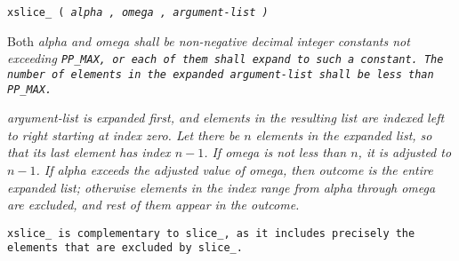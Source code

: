 
\tt{xslice_ (} \it{alpha} \tt{,} \it{omega} \tt{,} \it{argument-list} \tt{)}


Both \it{alpha} and \it{omega} shall be non-negative decimal integer constants
not exceeding \tt{PP_MAX}, or each of them shall expand to such a constant.
The number of elements in the expanded
\it{argument-list} shall be less than \tt{PP_MAX}.


\it{argument-list} is expanded first, and elements in the
resulting list are indexed left to right starting at index zero.
Let there be $n$ elements in the expanded list,
so that its last element has index $n - 1$.
If \it{omega} is not less than $n$, it is adjusted to $n - 1$.
If \it{alpha} exceeds the adjusted value of \it{omega},
then outcome is the entire expanded list;
otherwise elements in the index range from \it{alpha} through
\it{omega} are excluded, and rest of them appear in the outcome.

\note \tt{xslice_} is complementary to \tt{slice_},
as it includes precisely the elements that are excluded by \tt{slice_}.
